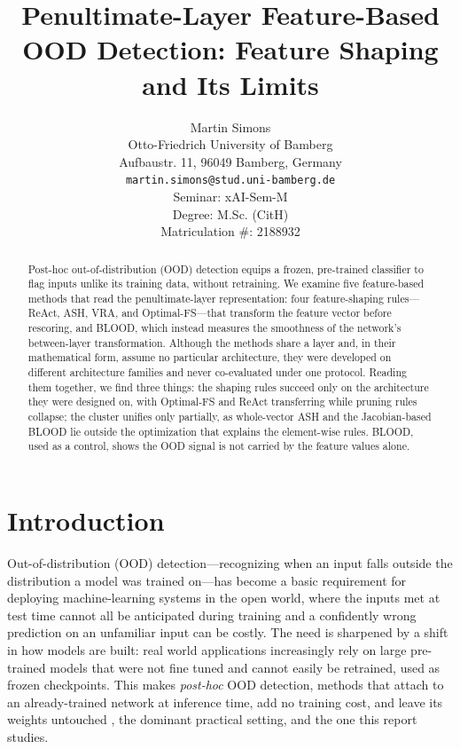 \documentclass[a4paper]{article}
\title{Penultimate-Layer Feature-Based OOD Detection: Feature Shaping and Its Limits}
\author{%
  Martin Simons\\
  Otto-Friedrich University of Bamberg\\
  Aufbaustr. 11, 96049 Bamberg, Germany\\
  \texttt{martin.simons@stud.uni-bamberg.de} \\[0.5cm]
  Seminar: xAI-Sem-M \\
  Degree: M.Sc. (CitH) \\
  Matriculation \#: 2188932
}
\begin{document}
\maketitle
\def\va{{\bm{a}}}

\begin{abstract}
  Post-hoc out-of-distribution (OOD) detection equips a frozen, pre-trained
  classifier to flag inputs unlike its training data, without retraining. We examine
  five feature-based methods that read the penultimate-layer representation: four
  feature-shaping rules---ReAct, ASH, VRA, and Optimal-FS---that transform the feature
  vector before rescoring, and BLOOD, which instead measures the smoothness of the
  network's between-layer transformation. Although the methods share a layer and, in
  their mathematical form, assume no particular architecture, they were developed on
  different architecture families and never co-evaluated under one protocol. Reading
  them together, we find three things: the shaping rules succeed only on the
  architecture they were designed on, with Optimal-FS and ReAct transferring while pruning rules collapse; the
  cluster unifies only partially, as whole-vector ASH and the Jacobian-based BLOOD lie
  outside the optimization that explains the element-wise rules. BLOOD, used as a
  control, shows the OOD signal is not carried by the feature values alone.
\end{abstract}


\section{Introduction}
\label{intro}


Out-of-distribution (OOD) detection---recognizing when an input falls outside the
distribution a model was trained on---has become a basic requirement for deploying
machine-learning systems in the open world, where the inputs met at test time cannot
all be anticipated during training and a confidently wrong prediction on an unfamiliar
input can be costly. The need is sharpened by a shift in how models are built:
real world applications increasingly rely on large pre-trained models that were not fine tuned and
cannot easily be retrained, used as frozen checkpoints. This makes \emph{post-hoc}
OOD detection, methods that attach to an already-trained network at inference time,
add no training cost, and leave its weights untouched \cite{survey}, the dominant practical setting,
and the one this report studies.
\end{document}
